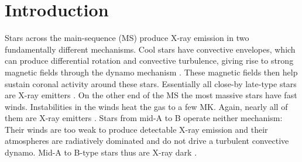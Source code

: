 \documentclass[linenumbers]{aastex631}
\begin{document}


\section{Introduction} \label{sec:intro}
Stars across the main-sequence (MS) produce X-ray emission in two fundamentally different mechanisms. Cool stars have convective envelopes, 
which can produce differential rotation and convective turbulence, giving rise to strong magnetic fields through the dynamo mechanism \citep{2017LRSP...14....4B}. These magnetic fields then help sustain coronal activity around these stars.
Essentially all close-by late-type stars are X-ray emitters \citep{2004A&A...417..651S}. On the other end of the MS the most massive stars have fast winds. Instabilities in the winds heat the gas to a few MK. Again, nearly all of them are X-ray emitters \citep{1996A&AS..118..481B,1997A&A...322..167B}. Stars from mid-A to B operate neither mechanism: Their winds are too weak to produce detectable X-ray emission and their atmospheres are radiatively dominated and do not drive a turbulent convective dynamo. Mid-A to B-type stars thus are X-ray dark \citep{1997A&A...318..215S}.
\end{document}
